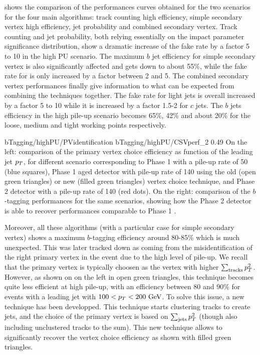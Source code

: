      shows the comparison of the performances curves
    obtained for the two scenarios for the four main algorithms: track counting high
    efficiency, simple secondary vertex high efficiency, jet probability and combined secondary vertex.
    Track counting and jet probability, both relying essentially on the impact parameter
    significance distribution, show a dramatic increase of the fake rate by a factor
    5 to 10 in the high PU scenario. The maximum $b$ jet efficiency for simple secondary 
    vertex is also significantly affected and gets down to about 55\%, while the fake rate 
    for is only increased by a factor between 2 and 5. The combined secondary vertex 
    performances finally give information to what can be expected from combining the 
    techniques together. The fake rate for light jets is overall increased by a factor 5 
    to 10 while it is increased by a factor 1.5-2 for $c$ jets. The $b$ jets efficiency in 
    the high pile-up scenario becomes 65\%, 42\% and about 20\% for the loose, medium and 
    tight working points respectively.

                     {bTagging/highPU/PVidentification}
                     {bTagging/highPU/CSVperf_2}
                     {0.49}
                     {On the left: comparison of the primary vertex choice efficiency as function of the
                     leading jet $p_T$, for different scenario corresponding to Phase 1
                     with a pile-up rate of 50 (blue squares),
                     Phase 1 aged detector with pile-up rate of 140 using the old (open
                     green triangles) or new (filled green triangles) vertex choice
                     technique, and Phase 2 detector with a pile-up rate of 140 (red dots).
                     On the right: comparison of the $b$-tagging performances for the same
                     scenarios, showing how the Phase 2 detector is able to recover performances
                     comparable to Phase 1 \cite{Phase2TDR}.}

    Moreover, all these algorithms (with a particular case for simple secondary vertex)
    shows a maximum $b$-tagging efficiency around 80-85\% which is much unexpected. This
    was later \cite{Phase2TDR} tracked down as coming from the misidentification of the right primary vertex
    in the event due to the high level of pile-up. We recall that the primary vertex
    is typically choosen as the vertex with higher $\sum_\text{tracks} p_T^2$. However,
    as shown on  on the left in open green triangles, this
    technique becomes quite less efficient at high pile-up, with an efficiency between 80 and 90\%
    for events with a leading jet with $100 < p_T < 200 ~\text{GeV}$. To solve this issue, a new
    technique has been developped. This technique starts clustering tracks to create jets,
    and the choice of the primary vertex is based on $\sum_\text{jets} p_T^2$ (though also
    including unclustered tracks to the sum). This new technique allows to significantly
    recover the vertex choice efficiency as shown with filled green triangles.

